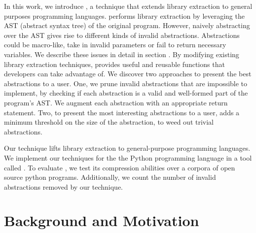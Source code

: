 In this work, we introduce \toolname, a technique that extends library extraction to general purposes programming languages. \toolname performs library extraction by leveraging the AST (abstract syntax tree) of the original program. However, naively abstracting over the AST gives rise to different kinds of invalid abstractions. Abstractions could be macro-like, take in invalid parameters or fail to return necessary variables. We describe these issues in detail in section .  
By modifying existing library extraction techniques, \toolname provides useful and reusable functions that developers can take advantage of. We discover two approaches to present the best abstractions to a user. One, we prune invalid abstractions that are impossible to implement, by checking if each abstraction is a valid and well-formed part of the program's AST. We augment each abstraction with an appropriate return statement.
Two, to present the most interesting abstractions to a user, \toolname adds a minimum threshold on the size of the abstraction, to weed out trivial abstractions. 

Our technique lifts library extraction to general-purpose programming languages. We implement our techniques for the the Python programming language in a tool called \toolname.
To evaluate \toolname, we test its compression abilities over a corpora of open source python programs. Additionally, we count the number of invalid abstractions removed by our technique.





\section{Background and Motivation}
